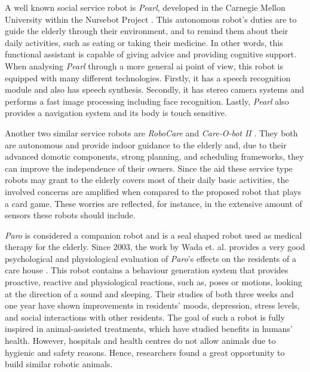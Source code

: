 A well known social service robot is \emph{Pearl}, developed in the Carnegie Mellon University within the Nursebot Project \cite{Pollack2002}.
This autonomous robot's duties are to guide the elderly through their environment, and to remind them about their daily activities, such as eating or taking their medicine.
In other words, this functional assistant is capable of giving advice and providing cognitive support.
When analysing \emph{Pearl} through a more general \gls{ai} point of view, this robot is equipped with many different technologies.
Firstly, it has a speech recognition module and also has speech synthesis.
Secondly, it has stereo camera systems and performs a fast image processing including face recognition.
Lastly, \emph{Pearl} also provides a navigation system and its body is touch sensitive.

Another two similar service robots are \emph{RoboCare} \cite{Bahadori} and \emph{Care-O-bot II} \cite{Graf2004}.
They both are autonomous and provide indoor guidance to the elderly and, due to their advanced domotic components, strong planning, and scheduling frameworks, they can improve the independence of their owners.
Since the aid these service type robots may grant to the elderly covers most of their daily basic activities, the involved concerns are amplified when compared to the proposed robot that plays a card game.
These worries are reflected, for instance, in the extensive amount of sensors these robots should include.

\emph{Paro} is considered a companion robot and is a seal shaped robot used as medical therapy for the elderly.
Since 2003, the work by Wada et. al. provides a very good psychological and physiological evaluation of \emph{Paro}'s effects on the residents of a care house \cite{Wada2003,Wada2005,Wada2007}.
This robot contains a behaviour generation system that provides proactive, reactive and physiological reactions, such as, poses or motions, looking at the direction of a sound and sleeping.
Their studies of both three weeks and one year have shown improvements in residents' moods, depression, stress levels, and social interactions with other residents.
The goal of such a robot is fully inspired in animal-assisted treatments, which have studied benefits in humans' health.
However, hospitals and health centres do not allow animals due to hygienic and safety reasons.
Hence, researchers found a great opportunity to build similar robotic animals.


